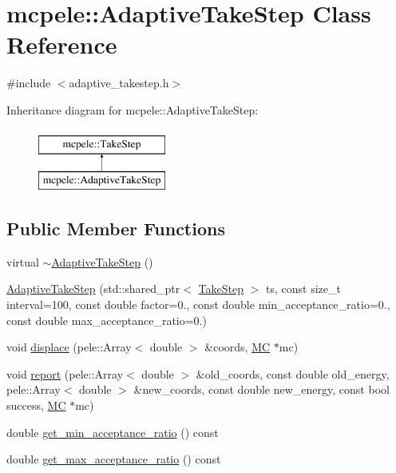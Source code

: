 \hypertarget{classmcpele_1_1AdaptiveTakeStep}{\section{mcpele\-:\-:\-Adaptive\-Take\-Step \-Class \-Reference}
\label{classmcpele_1_1AdaptiveTakeStep}
}


{\ttfamily \#include $<$adaptive\-\_\-takestep.\-h$>$}

\-Inheritance diagram for mcpele\-:\-:\-Adaptive\-Take\-Step\-:\begin{figure}[H]
\begin{center}
\leavevmode
\includegraphics[height=2.000000cm]{classmcpele_1_1AdaptiveTakeStep}
\end{center}
\end{figure}
\subsection*{\-Public \-Member \-Functions}
\begin{DoxyCompactItemize}
\item 
virtual \hyperlink{classmcpele_1_1AdaptiveTakeStep_a6f42dbb0ed0d9dcd88b47e267368b34f}{$\sim$\-Adaptive\-Take\-Step} ()
\item 
\hyperlink{classmcpele_1_1AdaptiveTakeStep_a1ee619caed0973ddea12e0d1a4ce8e9d}{\-Adaptive\-Take\-Step} (std\-::shared\-\_\-ptr$<$ \hyperlink{classmcpele_1_1TakeStep}{\-Take\-Step} $>$ ts, const size\-\_\-t interval=100, const double factor=0., const double min\-\_\-acceptance\-\_\-ratio=0., const double max\-\_\-acceptance\-\_\-ratio=0.)
\item 
void \hyperlink{classmcpele_1_1AdaptiveTakeStep_a63b75b0fda5b685fdfd8076f1e099523}{displace} (pele\-::\-Array$<$ double $>$ \&coords, \hyperlink{classmcpele_1_1MC}{\-M\-C} $\ast$mc)
\item 
void \hyperlink{classmcpele_1_1AdaptiveTakeStep_a3787085dd0bdf41fee0787c13265edea}{report} (pele\-::\-Array$<$ double $>$ \&old\-\_\-coords, const double old\-\_\-energy, pele\-::\-Array$<$ double $>$ \&new\-\_\-coords, const double new\-\_\-energy, const bool success, \hyperlink{classmcpele_1_1MC}{\-M\-C} $\ast$mc)
\item 
double \hyperlink{classmcpele_1_1AdaptiveTakeStep_ac3693c26dbad6a3a1f5003626da0eff4}{get\-\_\-min\-\_\-acceptance\-\_\-ratio} () const 
\item 
double \hyperlink{classmcpele_1_1AdaptiveTakeStep_a245d6ab24dce23791a2a75fd896b21e5}{get\-\_\-max\-\_\-acceptance\-\_\-ratio} () const 
\end{DoxyCompactItemize}
